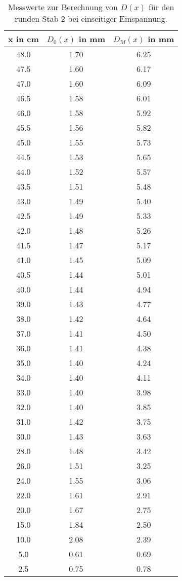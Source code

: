 \begin{table}
  \centering
  \begin{tabular}{c c c}
    \toprule
    x in \si{\centi\meter} & $D_0(x)$ in \si{\milli\meter} & $D_M(x)$ in \si{\milli\meter} \\
    \midrule
    48.0 & 1.70 & 6.25 \\
    47.5 & 1.60 & 6.17 \\
    47.0 & 1.60 & 6.09 \\
    46.5 & 1.58 & 6.01 \\
    46.0 & 1.58 & 5.92 \\
    45.5 & 1.56 & 5.82 \\
    45.0 & 1.55 & 5.73 \\
    44.5 & 1.53 & 5.65 \\
    44.0 & 1.52 & 5.57 \\
    43.5 & 1.51 & 5.48 \\
    43.0 & 1.49 & 5.40 \\
    42.5 & 1.49 & 5.33 \\
    42.0 & 1.48 & 5.26 \\
    41.5 & 1.47 & 5.17 \\
    41.0 & 1.45 & 5.09 \\
    40.5 & 1.44 & 5.01 \\
    40.0 & 1.44 & 4.94 \\
    39.0 & 1.43 & 4.77 \\
    38.0 & 1.42 & 4.64 \\
    37.0 & 1.41 & 4.50 \\
    36.0 & 1.41 & 4.38 \\
    35.0 & 1.40 & 4.24 \\
    34.0 & 1.40 & 4.11 \\
    33.0 & 1.40 & 3.98 \\
    32.0 & 1.40 & 3.85 \\
    31.0 & 1.42 & 3.75 \\
    30.0 & 1.43 & 3.63 \\
    28.0 & 1.48 & 3.42 \\
    26.0 & 1.51 & 3.25 \\
    24.0 & 1.55 & 3.06 \\
    22.0 & 1.61 & 2.91 \\
    20.0 & 1.67 & 2.75 \\
    15.0 & 1.84 & 2.50 \\
    10.0 & 2.08 & 2.39 \\
    5.0  & 0.61 & 0.69 \\
    2.5  & 0.75 & 0.78 \\
    \bottomrule
  \end{tabular}
  \caption{Messwerte zur Berechnung von $D(x)$ für den runden Stab 2 bei einseitiger
  Einspannung.}
  \label{tab:messung2}
\end{table}


